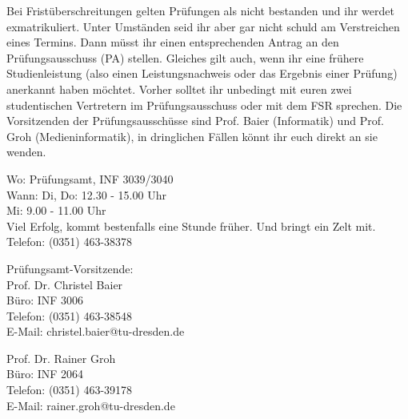 Bei Fristüberschreitungen gelten Prüfungen als nicht bestanden und ihr werdet exmatrikuliert.
Unter Umständen seid ihr aber gar nicht schuld am Verstreichen eines Termins.
Dann müsst ihr einen entsprechenden Antrag an den Prüfungsausschuss (PA) stellen.
Gleiches gilt auch, wenn ihr eine frühere Studienleistung (also einen Leistungsnachweis oder das Ergebnis einer Prüfung) anerkannt haben möchtet.
Vorher solltet ihr unbedingt mit euren zwei studentischen Vertretern im Prüfungsausschuss oder mit dem FSR sprechen.
Die Vorsitzenden der Prüfungsausschüsse sind Prof. Baier (Informatik) und Prof. Groh (Medieninformatik), in dringlichen Fällen könnt ihr euch direkt an sie wenden.

Wo: Prüfungsamt, INF 3039/3040 \\
Wann: Di, Do: 12.30 - 15.00 Uhr \\
Mi: 9.00 - 11.00 Uhr \\
Viel Erfolg, kommt bestenfalls eine Stunde früher.
Und bringt ein Zelt mit. \\
Telefon: (0351) 463-38378

Prüfungsamt-Vorsitzende: \\
Prof. Dr. Christel Baier \\
Büro: INF 3006 \\
Telefon: (0351) 463-38548 \\
E-Mail: christel.baier@tu-dresden.de

Prof. Dr. Rainer Groh \\
Büro: INF 2064 \\
Telefon: (0351) 463-39178 \\
E-Mail: rainer.groh@tu-dresden.de
